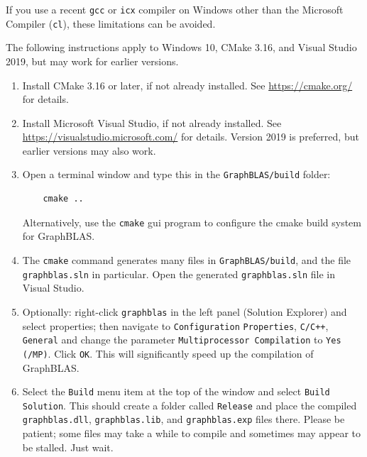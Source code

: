 If you use a recent \verb'gcc' or \verb'icx' compiler on Windows other than the
Microsoft Compiler (\verb'cl'), these limitations can be avoided.

The following instructions apply to Windows 10, CMake 3.16, and
Visual Studio 2019, but may work for earlier versions.

\begin{enumerate}

\item Install CMake 3.16 or later, if not already installed.
    See \url{https://cmake.org/} for details.

\item Install Microsoft Visual Studio, if not already installed.
    See \url{https://visualstudio.microsoft.com/} for details.
    Version 2019 is preferred, but earlier versions may also work.

\item Open a terminal window and type this in the
    \verb'GraphBLAS/build' folder:

    \vspace{-0.1in}
    {\small
    \begin{verbatim}
    cmake ..  \end{verbatim} }
    \vspace{-0.1in}

    Alternatively, use the \verb'cmake' gui program to configure
    the cmake build system for GraphBLAS.

\item The \verb'cmake' command generates many files in
    \verb'GraphBLAS/build', and the file \verb'graphblas.sln' in
    particular.  Open the generated \verb'graphblas.sln' file in Visual Studio.

\item Optionally: right-click \verb'graphblas' in the left panel (Solution
    Explorer) and select properties; then navigate to \verb'Configuration'
    \verb'Properties', \verb'C/C++', \verb'General' and change the parameter
    \verb'Multiprocessor Compilation' to \verb'Yes (/MP)'.  Click \verb'OK'.
    This will significantly speed up the compilation of GraphBLAS.

\item Select the \verb'Build' menu item at the top of the window and
    select \verb'Build Solution'.  This should create a folder called
    \verb'Release' and place the compiled \verb'graphblas.dll',
    \verb'graphblas.lib', and \verb'graphblas.exp' files there.  Please be
    patient; some files may take a while to compile and sometimes may appear to
    be stalled.  Just wait.


\end{enumerate}
